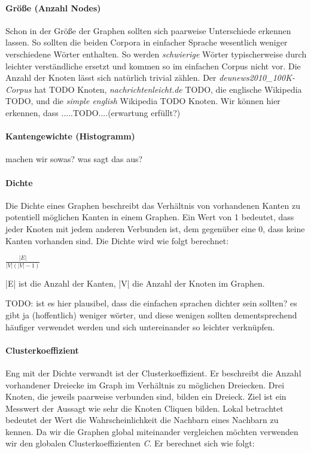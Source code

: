 \documentclass[12pt]{article}
\begin{document}
\paragraph{Gr\"o\ss{}e (Anzahl Nodes)}
Schon in der Größe der Graphen sollten sich paarweise Unterschiede erkennen lassen. So sollten die beiden Corpora in einfacher Sprache wesentlich weniger verschiedene Wörter enthalten. So werden \emph{schwierige} Wörter typischerweise durch leichter verständliche ersetzt und kommen so im einfachen Corpus nicht vor. Die Anzahl der Knoten lässt sich natürlich trivial zählen. Der \emph{deunews2010\_100K-Corpus} hat TODO Knoten, \emph{nachrichtenleicht.de} TODO, die englische Wikipedia TODO, und die \emph{simple english} Wikipedia TODO Knoten. Wir können hier erkennen, dass .....TODO....(erwartung erfüllt?)
 
\paragraph{Kantengewichte (Histogramm)}
machen wir sowas? was sagt das aus?

\paragraph{Dichte}
Die Dichte eines Graphen beschreibt das Verhältnis von vorhandenen Kanten zu potentiell möglichen Kanten in einem Graphen. Ein Wert von 1 bedeutet, dass jeder Knoten mit jedem anderen Verbunden ist, dem gegenüber eine 0, dass keine Kanten vorhanden sind. Die Dichte wird wie folgt berechnet:

\begin{center}
  \begin{math}
    \frac{|E|}{|V|(|V|-1)}
  \end{math}
\end{center}


|E| ist die Anzahl der Kanten, |V| die Anzahl der Knoten im Graphen. 

TODO: ist es hier plausibel, dass die einfachen sprachen dichter sein sollten? es gibt ja (hoffentlich) weniger wörter, und diese wenigen sollten dementsprechend häufiger verwendet werden und sich untereinander so leichter verknüpfen.

\paragraph{Clusterkoeffizient}
Eng mit der Dichte verwandt ist der Clusterkoeffizient. Er beschreibt die Anzahl vorhandener Dreiecke im Graph im Verhältnis zu möglichen Dreiecken. Drei Knoten, die jeweils paarweise verbunden sind, bilden ein Dreieck. Ziel ist ein Messwert der Aussagt wie sehr die Knoten Cliquen bilden. Lokal betrachtet bedeutet der Wert die Wahrscheinlichkeit die Nachbarn eines Nachbarn zu kennen. Da wir die Graphen global miteinander vergleichen möchten verwenden wir den globalen Clusterkoeffizienten \emph{C}. Er berechnet sich wie folgt:
\end{document}
